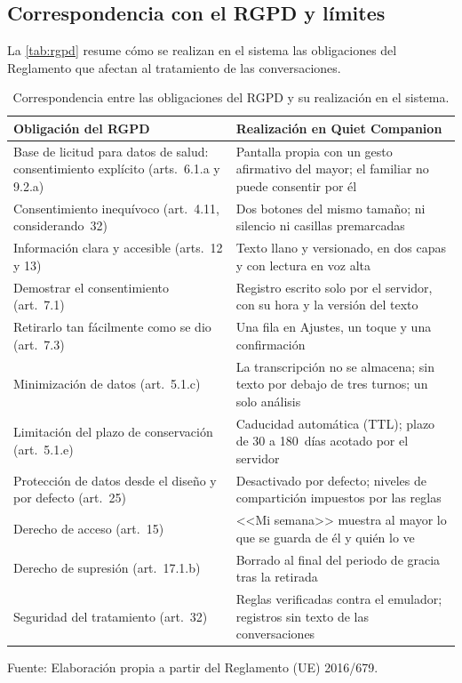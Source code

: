 \subsection{Correspondencia con el RGPD y límites}

La \autoref{tab:rgpd} resume cómo se realizan en el sistema las obligaciones del Reglamento que afectan al tratamiento de las conversaciones.

\begin{table}[!tb]
    \centering
    \caption{Correspondencia entre las obligaciones del RGPD y su realización en el sistema.}
    \label{tab:rgpd}
    \small
    \begin{tabularx}{\textwidth}{@{}>{\RaggedRight\arraybackslash}p{} >{\RaggedRight\arraybackslash}X@{}}
        \toprule
        \textbf{Obligación del RGPD} & \textbf{Realización en Quiet Companion} \\
        \midrule
        Base de licitud para datos de salud: consentimiento explícito (arts.~6.1.a y 9.2.a) & Pantalla propia con un gesto afirmativo del mayor; el familiar no puede consentir por él \\
        Consentimiento inequívoco (art.~4.11, considerando~32) & Dos botones del mismo tamaño; ni silencio ni casillas premarcadas \\
        Información clara y accesible (arts.~12 y 13) & Texto llano y versionado, en dos capas y con lectura en voz alta \\
        Demostrar el consentimiento (art.~7.1) & Registro escrito solo por el servidor, con su hora y la versión del texto \\
        Retirarlo tan fácilmente como se dio (art.~7.3) & Una fila en Ajustes, un toque y una confirmación \\
        \raggedright Minimización de datos (art.~5.1.c) & La transcripción no se almacena; sin texto por debajo de tres turnos; un solo análisis \\
        Limitación del plazo de conservación (art.~5.1.e) & Caducidad automática (TTL); plazo de 30 a 180~días acotado por el servidor \\
        Protección de datos desde el diseño y por defecto (art.~25) & Desactivado por defecto; niveles de compartición impuestos por las reglas \\
        Derecho de acceso (art.~15) & <<Mi semana>> muestra al mayor lo que se guarda de él y quién lo ve \\
        \raggedright Derecho de supresión (art.~17.1.b) & Borrado al final del periodo de gracia tras la retirada \\
        Seguridad del tratamiento (art.~32) & Reglas verificadas contra el emulador; registros sin texto de las conversaciones \\
        \bottomrule
    \end{tabularx}

    \vspace{2pt}
    {\footnotesize Fuente: Elaboración propia a partir del Reglamento (UE) 2016/679.}
\end{table}

